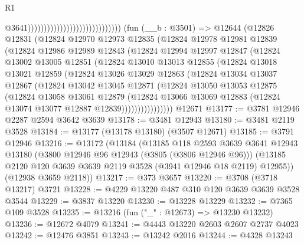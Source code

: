 \begin{lexlean}{R1}
\begin{coremodule}
                                                              @3641)))))))))))))))))))))))))))))
    (fun (__b : @3501) =>
    @12644
      (@12826
        @12831
        (@12824
          @12970
          @12973
          @12835
          (@12824
            @12978
            @12981
            @12839
            (@12824
              @12986
              @12989
              @12843
              (@12824
                @12994
                @12997
                @12847
                (@12824
                  @13002
                  @13005
                  @12851
                  (@12824
                    @13010
                    @13013
                    @12855
                    (@12824
                      @13018
                      @13021
                      @12859
                      (@12824
                        @13026
                        @13029
                        @12863
                        (@12824
                          @13034
                          @13037
                          @12867
                          (@12824
                            @13042
                            @13045
                            @12871
                            (@12824
                              @13050
                              @13053
                              @12875
                              (@12824
                                @13058
                                @13061
                                @12879
                                (@12824
                                  @13066
                                  @13069
                                  @12883
                                  (@12824 @13074 @13077 @12887 @12839))))))))))))))))
    @12671
@13177 := @3781 @12946 @2287 @2594 @3642 @3639
@13178 := @3481 @12943
@13180 := @3481 @2119 @3528
@13184 := @13177 (@13178 @13180) (@3507 @12671)
@13185 := @3791 @12946
@13216 := @13172
    (@13184
      (@13185
        @118
        @2593
        @3639
        @3641
        @12943
        @13180
        (@3800 @12946 @96 @12943 (@3805 (@3806 @12946 @96)))
        (@13185 @2120 @120 @3639 @3639 @2119 @3528 (@3941 @12946 @18 @2119) @12955))
      (@12938 @3659 @2118))
@13217 := @373 @3657
@13220 := @3708 (@3718 @13217) @3721
@13228 := @4229 @13220 @487 @310 @120 @3639 @3639 @3528 @3544
@13229 := @3837 @13220
@13230 := @13228 @13229
@13232 := @7365 @109 @3528
@13235 := @13216 (fun ("_" : @12673) => @13230 @13232)
@13236 := @12672 @4079
@13241 := @4443 @13220 @2603 @2607 @2737 @4023
@13242 := @12476 @3851
@13243 := @13242 @2016
@13244 := @4328 @13243

\end{coremodule}
\end{lexlean}

